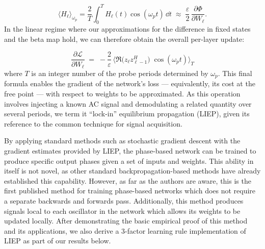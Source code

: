 \begin{equation}
\langle H_\ell \rangle_{\omega_p} = \frac{2}{T}\int_0^T H_\ell(t) \cos(\omega_p t) \, \dd t
\;\approx\; \frac{\varepsilon}{2}\,\frac{\partial \Phi}{\partial W_\ell}.
\end{equation}
In the linear regime where our approximations for the difference in fixed states and the beta map hold, we can therefore obtain the overall per-layer update:

\begin{equation}\boxed{
\frac{\partial \mathcal{L}}{\partial W_\ell}
\;=\;
-\frac{2}{\varepsilon}\,
\Big\langle \Re\big(z_\ell z_{\ell-1}^H\big)\;\cos(\omega_p t) \Big\rangle_T
}\label{eq:lockin-gradient}
\end{equation}
where $T$ is an integer number of the probe periods determined by $\omega_p$. This final formula enables the gradient of the network's loss --- equivalently, its cost at the free point --- with respect to weights to be approximated. As this operation involves injecting a known AC signal and demodulating a related quantity over several periods, we term it ``lock-in'' equilibrium propagation (LIEP), given its reference to the common technique for signal acquisition. 

By applying standard methods such as stochastic gradient descent with the gradient estimates provided by LIEP, the phase-based network can be trained to produce specific output phases given a set of inputs and weights. This ability in itself is not novel, as other standard backpropagation-based methods have already established this capability. However, as far as the authors are aware, this is the first published method for training phase-based networks which does not require a separate backwards and forwards pass. Additionally, this method produces signals local to each oscillator in the network which allows its weights to be updated locally. After demonstrating the basic empirical proof of this method and its applications, we also derive a 3-factor learning rule implementation of LIEP as part of our results below.
